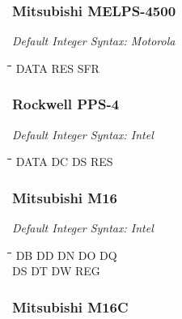 \subsubsection{Mitsubishi MELPS-4500}

{\em Default Integer Syntax: Motorola}

{\tt\begin{tabbing}
\hspace{3cm}\=\hspace{3cm}\=\hspace{3cm}\=\hspace{3cm}\=\kill
DATA       \> RES         \> SFR \\
\end{tabbing}}

\subsubsection{Rockwell PPS-4}

{\em Default Integer Syntax: Intel}

{\tt\begin{tabbing}
\hspace{3cm}\=\hspace{3cm}\=\hspace{3cm}\=\hspace{3cm}\=\kill
DATA       \> DC          \> DS          \> RES \\
\end{tabbing}}


\subsubsection{Mitsubishi M16}

{\em Default Integer Syntax: Intel}

{\tt\begin{tabbing}
\hspace{3cm}\=\hspace{3cm}\=\hspace{3cm}\=\hspace{3cm}\=\kill
DB         \> DD          \> DN          \> DO          \> DQ \\
DS         \> DT          \> DW          \> REG \\
\end{tabbing}}

\subsubsection{Mitsubishi M16C}

